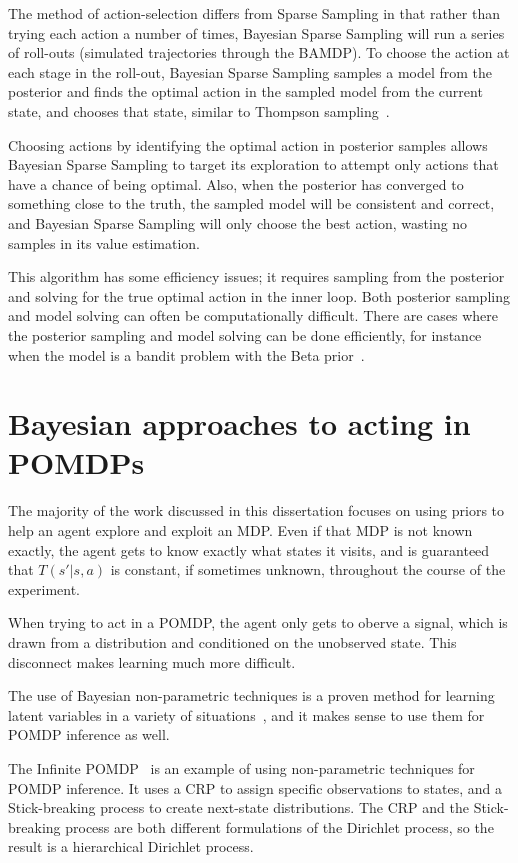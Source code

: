 The method of action-selection differs from Sparse Sampling in that rather than trying each action a number of times, Bayesian Sparse Sampling will run a series of roll-outs (simulated trajectories through the BAMDP). To choose the action at each stage in the roll-out, Bayesian Sparse Sampling samples a model from the posterior and finds the optimal action in the sampled model from the current state, and chooses that state, similar to Thompson sampling~\cite{thompson33}.

Choosing actions by identifying the optimal action in posterior samples allows Bayesian Sparse Sampling to target its exploration to attempt only actions that have a chance of being optimal. Also, when the posterior has converged to something close to the truth, the sampled model will be consistent and correct, and Bayesian Sparse Sampling will only choose the best action, wasting no samples in its value estimation.

This algorithm has some efficiency issues; it requires sampling from the posterior and solving for the true optimal action in the inner loop. Both posterior sampling and model solving can often be computationally difficult. There are cases where the posterior sampling and model solving can be done efficiently, for instance when the model is a bandit problem with the Beta prior~\cite{wang05}.


\section{Bayesian approaches to acting in POMDPs}

The majority of the work discussed in this dissertation focuses on using priors to help an agent explore and exploit an MDP. Even if that MDP is not known exactly, the agent gets to know exactly what states it visits, and is guaranteed that $T(s'|s,a)$ is constant, if sometimes unknown, throughout the course of the experiment.

When trying to act in a POMDP, the agent only gets to oberve a signal, which is drawn from a distribution and conditioned on the unobserved state. This disconnect makes learning much more difficult.

The use of Bayesian non-parametric techniques is a proven method for learning latent variables in a variety of situations~\cite{blei2003latent,Blei04hierarchicaltopic,asmuth09}, and it makes sense to use them for POMDP inference as well.

The Infinite POMDP~\cite{doshi2009infinite} is an example of using non-parametric techniques for POMDP inference. It uses a CRP to assign specific observations to states, and a Stick-breaking process to create next-state distributions. The CRP and the Stick-breaking process are both different formulations of the Dirichlet process, so the result is a hierarchical Dirichlet process.

